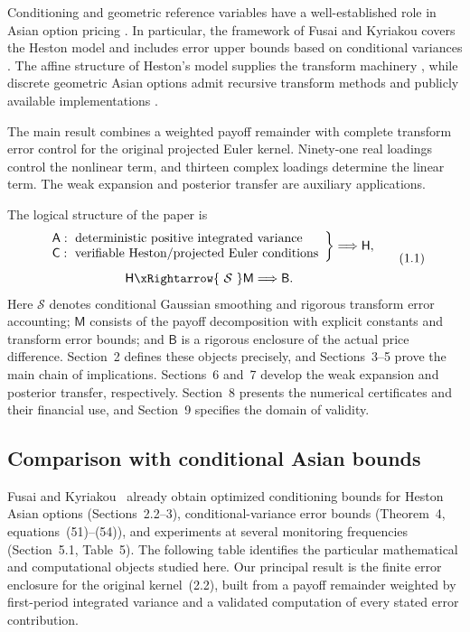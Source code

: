 Conditioning and geometric reference variables have a well-established role in Asian option pricing \cite{Curran1994,RogersShi1995,Thompson2002,FusaiKyriakou2016}. In particular, the framework of Fusai and Kyriakou covers the Heston model and includes error upper bounds based on conditional variances \cite{FusaiKyriakou2016}. The affine structure of Heston's model supplies the transform machinery \cite{Heston1993}, while discrete geometric Asian options admit recursive transform methods \cite{KimKimKimWee2016} and publicly available implementations \cite{QuantLibDiscreteGeometricHeston}.

The main result combines a weighted payoff remainder with complete transform
error control for the original projected Euler kernel. Ninety-one real loadings
control the nonlinear term, and thirteen complex loadings determine the linear
term. The weak expansion and posterior transfer are auxiliary applications.

The logical structure of the paper is
\[
\begin{gathered}
\left.
\begin{array}{l}
\mathsf A:\ \text{deterministic positive integrated variance}\\
\mathsf C:\ \text{verifiable Heston/projected Euler conditions}
\end{array}
\right\}\Longrightarrow\mathsf H,\\[4pt]
\mathsf H\xRightarrow{\ \mathcal S\ }\mathsf M\Longrightarrow\mathsf B .
\end{gathered}
\tag{1.1}
\]
Here \(\mathcal S\) denotes conditional Gaussian smoothing and rigorous transform error accounting; \(\mathsf M\) consists of the payoff decomposition with explicit constants and transform error bounds; and \(\mathsf B\) is a rigorous enclosure of the actual price difference. Section~2 defines these objects precisely, and Sections~3--5 prove the main chain of implications. Sections~6 and~7 develop the weak expansion and posterior transfer, respectively. Section~8 presents the numerical certificates and their financial use, and Section~9 specifies the domain of validity.


\subsection{Comparison with conditional Asian bounds}


Fusai and Kyriakou~\cite{FusaiKyriakou2016} already obtain optimized
conditioning bounds for Heston Asian options (Sections~2.2--3),
conditional-variance error bounds (Theorem~4, equations~(51)--(54)), and
experiments at several monitoring frequencies (Section~5.1, Table~5).
The following table identifies the particular mathematical
and computational objects studied here. Our principal result is
the finite error enclosure for the original kernel~(2.2), built from a
payoff remainder weighted by first-period integrated variance and a
validated computation of every stated error contribution.





